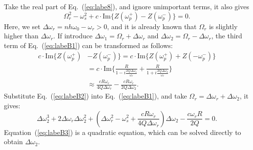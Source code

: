 \documentclass[%
 reprint,
 amsmath,amssymb,
 aps,
]{revtex4-1}
\begin{document}
Take the real part of Eq.~(\ref{eq:labe8}), and ignore unimportant terms, it also gives
\begin{equation}\label{eq:labeB1}
      \Omega^2_r-\omega^2_s+c \cdot \mathrm {Im}\{Z(\omega^{+}_p)-Z(\omega^{-}_p)\}= 0.
\end{equation}
Here, we set $\Delta\omega_r=nh\omega_0-\omega_r>0$,  and it is already known that $\Omega_r$ is slightly higher than $\Delta\omega_r$. If introduce $\Delta\omega_1=\Omega_r+\Delta\omega_r$ and $\Delta\omega_2=\Omega_r-\Delta\omega_r$, the third term of Eq.~(\ref{eq:labeB1}) can be transformed as follows:
\begin{equation}\label{eq:labeB2}
   \begin{aligned}
   c \cdot \mathrm {Im}\{Z(\omega^{+}_p)&-Z(\omega^{-}_p)\}=c \cdot \mathrm {Im}\{Z(\omega^{+}_p)+Z(-\omega^{-}_p)\}\\
   &=c \cdot \mathrm {Im}\{\frac{R}{1-i\frac{2Q\Delta\omega_1}{\omega_r}}+\frac{R}{1+i\frac{2Q\Delta\omega_2}{\omega_r}}\}\\
   &\approx \frac{cR\omega_r}{4Q\Delta\omega_r}-\frac{cR\omega_r}{2Q\Delta\omega_2}.
   \end{aligned}
\end{equation}
Substitute Eq.~(\ref{eq:labeB2}) into Eq.~(\ref{eq:labeB1}), and take $\Omega_r=\Delta\omega_r+\Delta\omega_2$, it gives:
\begin{equation}\label{eq:labeB3}
   \Delta\omega^3_2+2\Delta\omega_r \Delta\omega^2_2+(\Delta\omega^2_r-\omega^2_s+\frac{cR\omega_r}{4Q\Delta\omega_r})\Delta\omega_2-\frac{c\omega_r R}{2Q}=0.
\end{equation}
Equation~(\ref{eq:labeB3}) is a quadratic equation, which can be solved directly to obtain $\Delta\omega_2$.
\end{document}
